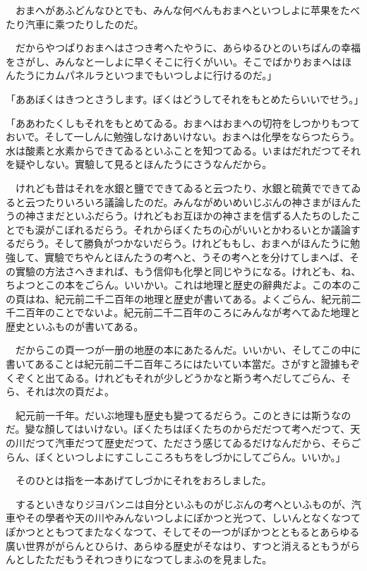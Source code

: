 \documentclass[tate,paper=b6j,jafontsize=9pt]{jlreq}
\begin{document}
　おまへがあふどんなひとでも、みんな何べんもおまへといつしよに苹果をたべたり汽車に乘つたりしたのだ。

　だからやつぱりおまへはさつき考へたやうに、あらゆるひとのいちばんの幸福をさがし、みんなと一しよに早くそこに行くがいい。そこでばかりおまへはほんたうにカムパネルラといつまでもいつしよに行けるのだ。」

「ああぼくはきつとさうします。ぼくはどうしてそれをもとめたらいいでせう。」

「ああわたくしもそれをもとめてゐる。おまへはおまへの切符をしつかりもつておいで。そして一しんに勉強しなけあいけない。おまへは化學をならつたらう。水は酸素と水素からできてゐるといふことを知つてゐる。いまはだれだつてそれを疑やしない。實驗して見るとほんたうにさうなんだから。

　けれども昔はそれを水銀と鹽でできてゐると云つたり、水銀と硫黄でできてゐると云つたりいろいろ議論したのだ。みんながめいめいじぶんの神さまがほんたうの神さまだといふだらう。けれどもお互ほかの神さまを信ずる人たちのしたことでも涙がこぼれるだらう。それからぼくたちの心がいいとかわるいとか議論するだらう。そして勝負がつかないだらう。けれどももし、おまへがほんたうに勉強して、實驗でちやんとほんたうの考へと、うその考へとを分けてしまへば、その實驗の方法さへきまれば、もう信仰も化學と同じやうになる。けれども、ね、ちよつとこの本をごらん。いいかい。これは地理と歴史の辭典だよ。この本のこの頁はね、紀元前二千二百年の地理と歴史が書いてある。よくごらん、紀元前二千二百年のことでないよ。紀元前二千二百年のころにみんなが考へてゐた地理と歴史といふものが書いてある。

　だからこの頁一つが一册の地歴の本にあたるんだ。いいかい、そしてこの中に書いてあることは紀元前二千二百年ころにはたいてい本當だ。さがすと證據もぞくぞくと出てゐる。けれどもそれが少しどうかなと斯う考へだしてごらん、そら、それは次の頁だよ。

　紀元前一千年。だいぶ地理も歴史も變つてるだらう。このときには斯うなのだ。變な顏してはいけない。ぼくたちはぼくたちのからだだつて考へだつて、天の川だつて汽車だつて歴史だつて、たださう感じてゐるだけなんだから、そらごらん、ぼくといつしよにすこしこころもちをしづかにしてごらん。いいか。」

　そのひとは指を一本あげてしづかにそれをおろしました。

　するといきなりジヨバンニは自分といふものがじぶんの考へといふものが、汽車やその學者や天の川やみんないつしよにぽかつと光つて、しいんとなくなつてぽかつとともつてまたなくなつて、そしてその一つがぽかつとともるとあらゆる廣い世界ががらんとひらけ、あらゆる歴史がそなはり、すつと消えるともうがらんとしたただもうそれつきりになつてしまふのを見ました。
\end{document}

